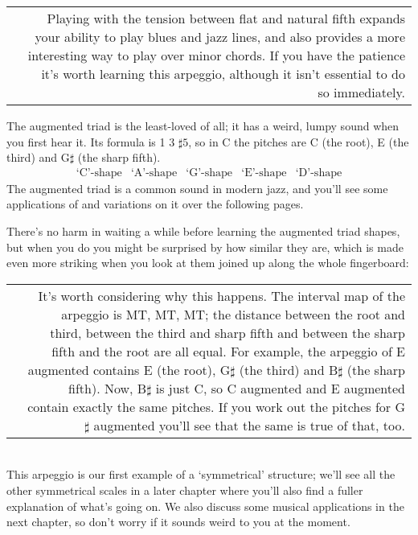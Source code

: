 \documentclass[english]{./gbook}
\begin{document}
\begin{large}
\begin{tabular}{rr}
& 
\parbox[b]{10cm}{
Playing with the tension between flat and natural fifth expands your ability to play blues and jazz lines, and also provides a more interesting way to play over minor chords. If you have the patience it's worth learning this arpeggio, although it isn't essential to do so immediately.

\rule{0pt}{15ex} 
}
\end{tabular}

The augmented triad is the least-loved of all; it has a weird, lumpy sound when you first hear it. Its formula is 1 3 $\sharp 5$, so in C the pitches are C (the root), E (the third) and G$\sharp$ (the sharp fifth).
\[
\begin{array}{ccccc}
	\text{`C'-shape} & \text{`A'-shape} & \text{`G'-shape} & \text{`E'-shape} & \text{`D'-shape}
\end{array}
\]
The augmented triad is a common sound in modern jazz, and you'll see some applications of and variations on it over the following pages.

There's no harm in waiting a while before learning the augmented triad shapes, but when you do you might be surprised by how similar they are, which is made even more striking when you look at them joined up along the whole fingerboard:\\
\begin{tabular}{rr}
& 
\parbox[b]{10cm}{
It's worth considering why this happens. The interval map of the arpeggio is MT, MT, MT; the distance between the root and third, between the third and sharp fifth and between the sharp fifth and the root are all equal. For example, the arpeggio of E augmented contains E (the root), G$\sharp$ (the third) and B$\sharp$ (the sharp fifth). Now, B$\sharp$ is just C, so C augmented and E augmented contain exactly the same pitches. If you work out the pitches for G$\sharp$ augmented you'll see that the same is true of that, too.
}
\end{tabular}\\
This arpeggio is our first example of a `symmetrical' structure; we'll see all the other symmetrical scales in a later chapter where you'll also find a fuller explanation of what's going on. We also discuss some musical applications in the next chapter, so don't worry if it sounds weird to you at the moment.



\end{large}
\end{document}
